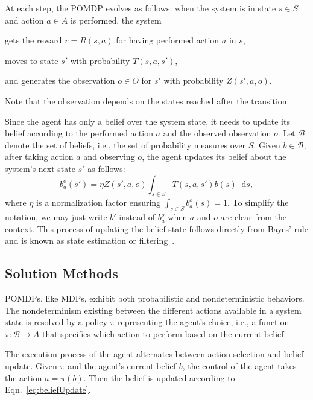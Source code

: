 \documentclass[orivec]{llncs}
\newcommand{\states}{S}
\newcommand{\actions}{A}
\newcommand{\observables}{O}
\newcommand{\trans}{T}
\newcommand{\obs}{Z}
\newcommand{\reward}{R}
\newcommand{\beliefs}{\mathcal{B}}
\newcommand{\policy}{\pi}
\newcommand{\diff}[1]{\mathop{}\!\mathrm{d}#1}
\begin{document}
At each step, the POMDP evolves as follows: 
when the system is in state $s \in \states$ and action $a \in \actions$ is performed, the system 
\begin{inparaenum}[1)]
\item
	gets the reward $r = \reward(s,a)$ for having performed action $a$ in $s$, 
\item
	moves to state $s'$ with probability $\trans(s, a, s')$,
\item
	and generates the observation $o \in \observables$ for $s'$ with probability $\obs(s', a, o)$.
\end{inparaenum}
Note that the observation depends on the states reached after the transition.

Since the agent has only a belief over the system state, it needs to update its belief according to the performed action $a$ and the observed observation $o$.
Let $\beliefs$ denote the set of beliefs, i.e., the set of probability measures over $\states$. 
Given $b \in \beliefs$, after taking action $a$ and observing $o$, the agent updates its belief about the system's next state $s'$ as follows:
\begin{equation} 
	b^{o}_{a}(s') = \eta \obs(s', a, o) \int_{s \in \states} \trans(s, a, s')  b(s) \diff{s},
	\label{eq:beliefUpdate}
\end{equation}
where $\eta$ is a normalization factor ensuring $\int_{s \in \states} b^{o}_{a}(s) = 1$.
To simplify the notation, we may just write $b'$ instead of $b^{o}_{a}$ when $a$ and $o$ are clear from the context.
This process of updating the belief state follows directly from Bayes' rule and is known as state estimation or filtering~\cite{book}.


\subsection{Solution Methods}
\label{ssec:POMDPSolutionMethods}

POMDPs, like MDPs, exhibit both probabilistic and nondeterministic behaviors.
The nondeterminism existing between the different actions available in a system state is resolved by a policy $\policy$ representing the agent's choice, i.e., a function $\policy \colon \beliefs \to \actions$ that specifies which action to perform based on the current belief.

The execution process of the agent alternates between action selection and belief update. 
Given $\policy$ and the agent's current belief $b$, the control of the agent takes the action $a = \policy(b)$. 
Then the belief is updated according to Eqn.~\eqref{eq:beliefUpdate}.
\end{document}
